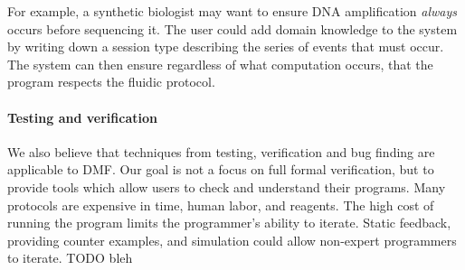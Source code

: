 \documentclass[
  10pt,
  a4paper,
  twocolumn,
]{article}
\begin{document}
For example, a synthetic biologist may want to ensure DNA amplification \emph{always} occurs before sequencing it.
The user could add domain knowledge to the system by writing down a session type describing the series of events that must occur.
The system can then ensure regardless of what computation occurs, that the program respects the fluidic protocol.

\paragraph{Testing and verification}

We also believe that techniques from testing, verification and bug finding are applicable to DMF.
Our goal is not a focus on full formal verification, but to provide tools which allow users to check and understand their programs.
Many protocols are expensive in time, human labor, and reagents.
The high cost of running the program limits the programmer's ability to iterate.
Static feedback, providing counter examples, and simulation
could allow non-expert programmers to iterate.
TODO bleh

\renewcommand*{\bibfont}{\footnotesize}
\printbibliography[heading=none]
\end{document}
